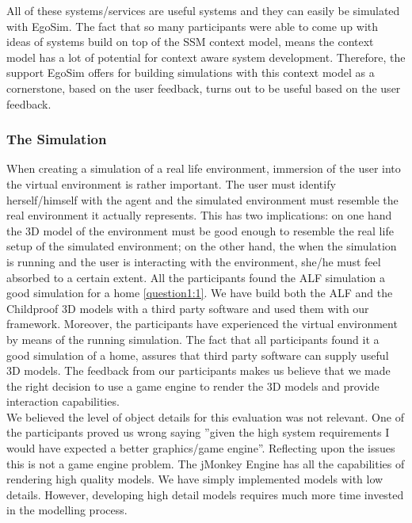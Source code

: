 All of these systems/services are useful systems and they can easily be simulated with EgoSim. The fact that so many participants were able to come up with ideas of systems build on top of the SSM context model, means the context model has a lot of potential for context aware system development. Therefore, the support EgoSim offers for building simulations with this context model as a cornerstone, based on the user feedback, turns out to be useful based on the user feedback.

\subsubsection{The Simulation} %
When creating a simulation of a real life environment, immersion of the user into the virtual environment is rather important. The user must identify herself/himself with the agent and the simulated environment must resemble the real environment it actually represents. This has two implications: on one hand the 3D model of the environment must be good enough to resemble the real life setup of the simulated environment; on the other hand, the when the simulation is running and the user is interacting with the environment, she/he must feel absorbed to a certain extent. All the participants found the ALF simulation a good simulation for a home \ref{question1:1}. We have build both the ALF and the Childproof 3D models with a third party software and used them with our framework. Moreover, the participants have experienced the virtual environment by means of the running simulation. The fact that all participants found it a good simulation of a home, assures that third party software can supply useful 3D models. The feedback from our participants makes us believe that we made the right decision to use a game engine to render the 3D models and provide interaction capabilities.\\

We believed the level of object details for this evaluation was not relevant. One of the participants proved us wrong saying ''given the high system requirements I would have expected a better graphics/game engine''. Reflecting upon the issues this is not a game engine problem. The jMonkey Engine has all the capabilities of rendering high quality models. We have simply implemented models with low details. However, developing high detail models requires much more time invested in the modelling process.\\

